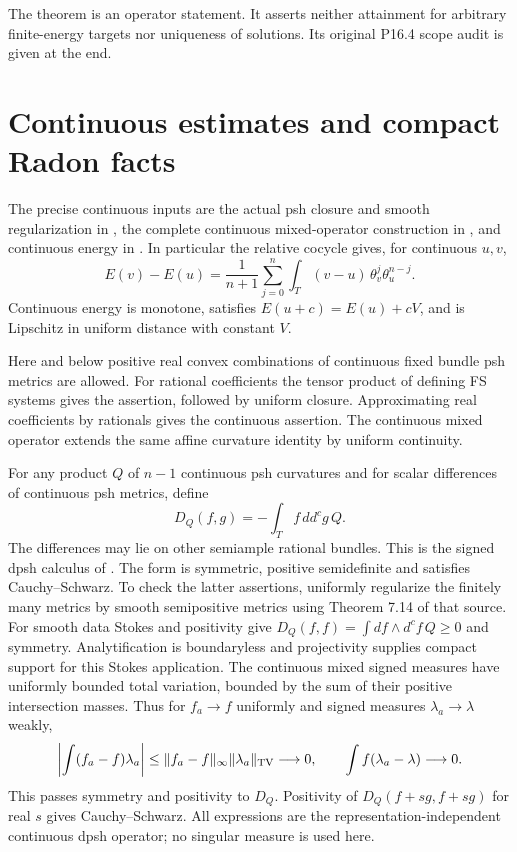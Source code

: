 \documentclass[11pt]{article}
\newcommand{\ddc}{dd^c}
\begin{document}
The theorem is an operator statement. It asserts neither attainment
for arbitrary finite-energy targets nor uniqueness of solutions. Its
original P16.4 scope audit is given at the end.

\section{Continuous estimates and compact Radon facts}

The precise continuous inputs are the actual psh closure and smooth
regularization in \cite[Section 7]{BE}, the complete continuous
mixed-operator construction in \cite[Section 8.1]{BE}, and continuous
energy in \cite[Definition 9.13 and Proposition 9.14]{BE}.
In particular the relative cocycle gives, for continuous $u,v$,
\begin{equation}\label{eq:energy-gap}
 E(v)-E(u)=\frac1{n+1}\sum_{j=0}^n
                    \int_T(v-u)\,\theta_v^j\theta_u^{n-j}.
\end{equation}
Continuous energy is monotone, satisfies $E(u+c)=E(u)+cV$, and is
Lipschitz in uniform distance with constant $V$.

Here and below positive real convex combinations of continuous fixed
bundle psh metrics are allowed. For rational coefficients the tensor
product of defining FS systems gives the assertion, followed by
uniform closure. Approximating real coefficients by rationals gives
the continuous assertion. The continuous mixed operator extends the
same affine curvature identity by uniform continuity.

For any product $Q$ of $n-1$ continuous psh curvatures and for scalar
differences of continuous psh metrics, define
\[
 D_Q(f,g)=-\int_T f\,\ddc g\,Q.
\]
The differences may lie on other semiample rational bundles. This is
the signed dpsh calculus of \cite[Section 8.1]{BE}. The form is
symmetric, positive semidefinite and satisfies Cauchy--Schwarz.
To check the latter assertions, uniformly regularize the finitely
many metrics by smooth semipositive metrics using Theorem 7.14 of
that source. For smooth data Stokes and positivity give
$D_Q(f,f)=\int df\wedge d^cf\,Q\geq0$ and symmetry. Analytification
is boundaryless and projectivity supplies compact support for this
Stokes application. The continuous mixed signed measures have
uniformly bounded total variation, bounded by the sum of their
positive intersection masses. Thus for $f_a\to f$ uniformly and
signed measures $\lambda_a\to\lambda$ weakly,
\[
 \left|\int(f_a-f)\lambda_a\right|
       \leq\|f_a-f\|_\infty\|\lambda_a\|_{\rm TV}\longrightarrow0,
 \qquad \int f(\lambda_a-\lambda)\longrightarrow0.
\]
This passes symmetry and positivity to $D_Q$. Positivity of
$D_Q(f+sg,f+sg)$ for real $s$ gives Cauchy--Schwarz. All expressions
are the representation-independent continuous dpsh operator; no
singular measure is used here.
\end{document}
